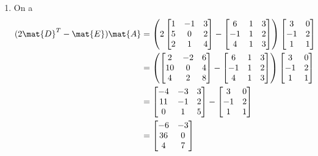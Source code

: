 \begin{exercice}
\begin{sol}
\begin{enumerate}
    \item On a
      \begin{align*}
        (2 \mat{D}^T - \mat{E}) \mat{A}
        &=
        \left(
          2
          \begin{bmatrix}
            1 & -1 & 3 \\ 5 & 0 & 2 \\ 2 & 1 & 4
          \end{bmatrix} -
          \begin{bmatrix}
            6 & 1 & 3 \\ -1 & 1 & 2 \\ 4 & 1 & 3
          \end{bmatrix}
        \right)
        \begin{bmatrix}
          3 & 0 \\ -1 & 2 \\ 1 & 1
        \end{bmatrix} \\
        &=
        \left(
          \begin{bmatrix}
            2 & -2 & 6 \\ 10 & 0 & 4 \\ 4 & 2 & 8
          \end{bmatrix} -
          \begin{bmatrix}
            6 & 1 & 3 \\ -1 & 1 & 2 \\ 4 & 1 & 3
          \end{bmatrix}
        \right)
        \begin{bmatrix}
          3 & 0 \\ -1 & 2 \\ 1 & 1
        \end{bmatrix} \\
        &=
        \begin{bmatrix}
          -4 & -3 & 3 \\ 11 & -1 & 2 \\ 0 & 1 & 5
        \end{bmatrix} -
        \begin{bmatrix}
          3 & 0 \\ -1 & 2 \\ 1 & 1
        \end{bmatrix} \\
        &=
        \begin{bmatrix}
          -6 & -3 \\ 36 & 0 \\ 4 & 7

\end{bmatrix}
\end{align*}
\end{enumerate}
\end{sol}
\end{exercice}
